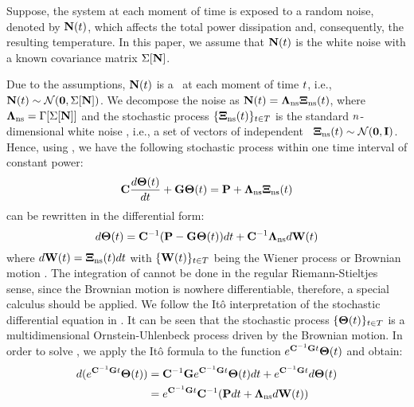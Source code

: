 Suppose, the system at each moment of time is exposed to a random noise, denoted by $\mathbf{N}(t)$, which affects the total power dissipation and, consequently, the resulting temperature. In this paper, we assume that $\mathbf{N}(t)$ is the white noise with a known covariance matrix $\Sigma[\mathbf{N}]$.

Due to the assumptions, $\mathbf{N}(t)$ is a \mnrv\ at each moment of time $t$, i.e., $\mathbf{N}(t) \sim \mathcal{N}(\mathbf{0}, \Sigma[\mathbf{N}])$. We decompose the noise as $\mathbf{N}(t) = \mathbf{\Lambda}_{\text{ns}} \mathbf{\Xi}_{\text{ns}}(t)$, where $\mathbf{\Lambda}_{\text{ns}} = \Gamma[\Sigma[\mathbf{N}]]$ and the stochastic process $\{ \mathbf{\Xi}_{\text{ns}}(t) \}_{t \in T}$ is the standard $n$-dimensional white noise \cite{oksendal2003}, i.e., a set of vectors of independent \snrvs\ $\mathbf{\Xi}_{\text{ns}}(t) \sim \mathcal{N}(\mathbf{0}, \mathbf{I})$. Hence, using , we have the following stochastic process within one time interval of constant power:
\begin{equation} \equlabel{fourier-noise}
  \mcapacitance \frac{d\vtemp(\time)}{d\time} + \mconductance \vtemp(\time) = \vpower + \ddev{\noisy} \vnormal_\noisy(\time)
\end{equation}
 can be rewritten in the differential form:
\begin{equation} \equlabel{fourier-wiener}
  d\vtemp(\time) = \mcapacitance^{-1} (\vpower - \mconductance \vtemp(\time))d\time + \mcapacitance^{-1} \ddev{\noisy} d\m{W}(\time)
\end{equation}
where $d\mathbf{W}(t) = \mathbf{\Xi}_{\text{ns}}(t) dt$ with $\{ \mathbf{W}(t) \}_{t \in T}$ being the Wiener process or Brownian motion \cite{oksendal2003}. The integration of  cannot be done in the regular Riemann-Stieltjes sense, since the Brownian motion is nowhere differentiable, therefore, a special calculus should be applied. We follow the It\^{o} interpretation \cite{oksendal2003} of the stochastic differential equation in . It can be seen that the stochastic process $\{ \mathbf{\Theta}(t) \}_{t \in T}$ is a multidimensional Ornstein-Uhlenbeck process \cite{kloeden1992} driven by the Brownian motion. In order to solve , we apply the It\^{o} formula \cite{oksendal2003} to the function $e^{ \mathbf{C}^{-1} \mathbf{G} t} \mathbf{\Theta}(t)$ and obtain:
\begin{align*}
  d(e^{\mathbf{C}^{-1} \mathbf{G} t} \mathbf{\Theta}(t)) & = \mathbf{C}^{-1} \mathbf{G} e^{\mathbf{C}^{-1} \mathbf{G} t} \mathbf{\Theta}(t) dt + e^{\mathbf{C}^{-1} \mathbf{G} t} d\mathbf{\Theta}(t) \\
  & = e^{\mathbf{C}^{-1} \mathbf{G} t} \mathbf{C}^{-1} (\mathbf{P} dt + \mathbf{\Lambda}_{\text{ns}} d\mathbf{W}(t))
\end{align*}
